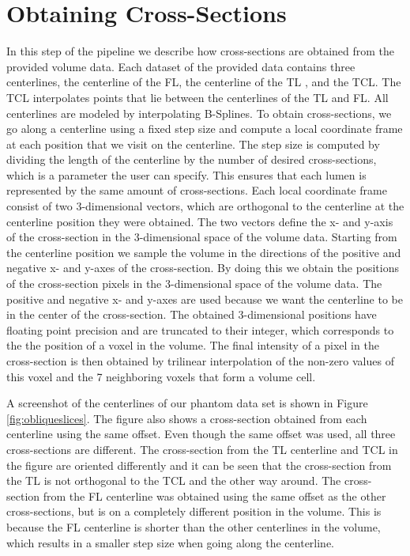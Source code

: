 \documentclass[thesis.tex]{subfiles}
\begin{document}
\section{Obtaining Cross-Sections}
In this step of the pipeline we describe how cross-sections are obtained from the provided volume data. Each dataset of the provided data contains three centerlines, the centerline of the FL, the centerline of the TL , and the TCL. The TCL interpolates points that lie between the centerlines of the TL and FL. All centerlines are modeled by interpolating B-Splines. To obtain cross-sections, we go along a centerline using a fixed step size and compute a local coordinate frame at each position that we visit on the centerline. The step size is computed by dividing the length of the centerline by the number of desired cross-sections, which is a parameter the user can specify. This ensures that each lumen is represented by the same amount of cross-sections. Each local coordinate frame consist of two 3-dimensional vectors, which are orthogonal to the centerline at the centerline position they were obtained. The two vectors define the x- and y-axis of the cross-section in the 3-dimensional space of the volume data. Starting from the centerline position we sample the volume in the directions of the positive and negative x- and y-axes of the cross-section. By doing this we obtain the positions of the cross-section pixels in the 3-dimensional space of the volume data. The positive and negative x- and y-axes are used because we want the centerline to be in the center of the cross-section. The obtained 3-dimensional positions have floating point precision and are truncated to their integer, which corresponds to the the position of a voxel in the volume. The final intensity of a pixel in the cross-section is then obtained by trilinear interpolation of the non-zero values of this voxel and the 7 neighboring voxels that form a volume cell.  

A screenshot of the centerlines of our phantom data set is shown in Figure \ref{fig:obliqueslices}. The figure also shows a cross-section obtained from each centerline using the same offset. Even though the same offset was used, all three cross-sections are different. The cross-section from the TL centerline and TCL in the figure are oriented differently and it can be seen that the cross-section from the TL is not orthogonal to the TCL and the other way around. The cross-section from the FL centerline was obtained using the same offset as the other cross-sections, but is on a completely different position in the volume. This is because the FL centerline is shorter than the other centerlines in the volume, which results in a smaller step size when going along the centerline. 
\end{document}
